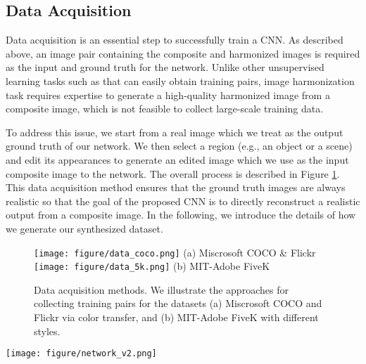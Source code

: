 \documentclass[10pt,twocolumn,letterpaper]{article}
\begin{document}
\subsection{Data Acquisition}
\label{sec:data}
%
Data acquisition is an essential step to successfully train a CNN.
%
As described above, an image pair containing the composite and harmonized images is required as the input and ground truth for the network.
%
Unlike other unsupervised learning tasks such as \cite{Zhang_ECCV_2016, Pathak_CVPR_2016} that can easily obtain training pairs, image harmonization task requires expertise to generate a high-quality harmonized image from a composite image, which is not feasible to collect large-scale training data.
%

To address this issue, we 
start from a real image which we treat as the output ground truth of our network.
%
We then select a region (e.g., an object or a scene) and edit its appearances to generate an edited image which we use as the input composite image to the network.
%
The overall process is described in Figure \ref{fig:data_coco_5k}.
%
This data acquisition method ensures that the ground truth images are always realistic 
so that the goal of the proposed CNN is to directly reconstruct a 
realistic output from a composite image.
%
In the following, we introduce the details of how we generate our synthesized dataset.
%
\begin{figure}[t]
	\centering
	\texttt{[image: figure/data\_coco.png]}
	\vspace{2mm}
	(a) Miscrosoft COCO \& Flickr \\
	\texttt{[image: figure/data\_5k.png]}
	\vspace{1mm}
	(b) MIT-Adobe FiveK \\
	\caption{Data acquisition methods. We illustrate the approaches for collecting training pairs for the datasets (a) Miscrosoft COCO and Flickr via color transfer, and (b) MIT-Adobe FiveK with different styles.
	}
	\label{fig:data_coco_5k}
\end{figure}
%
%
\begin{figure*}[t]
	\centering
	\texttt{[image: figure/network\_v2.png]}
	\caption{The overview of the proposed joint network architecture.
	Given a composite image and a provided foreground mask, we first pass the input through an encoder for learning feature representations.
	The encoder is then connected to two decoders, including a harmonization decoder for reconstructing the harmonized output and a scene parsing decoder to predict pixel-wise semantic labels.
	In order to use the learned semantics and improve harmonization results, we concatenate the feature maps from the scene parsing decoder to the harmonization decoder (denoted as dot-orange lines).
	In addition, we add skip links (denoted as blue-dot lines) between the encoder and decoders for retaining image details and textures.
	Note that, to keep the figure clean, we only depict the links for the harmonization decoder, while the scene parsing decoder has the same skip links connected to the encoder.
	}
	\label{fig:network}
\end{figure*}
\end{document}
